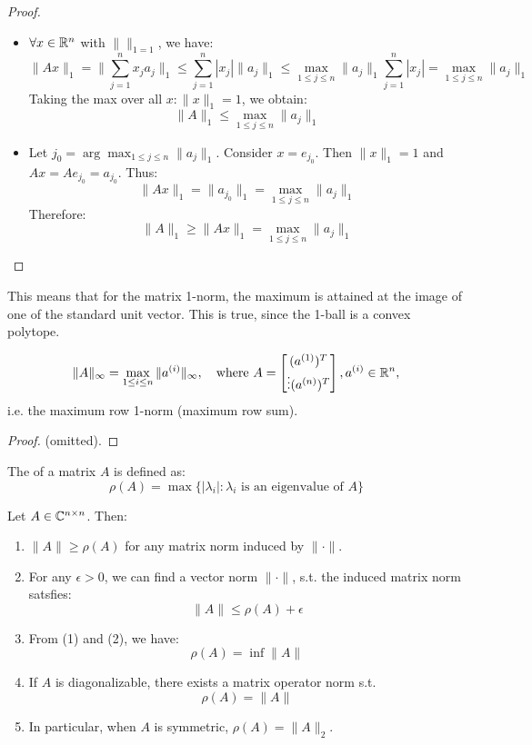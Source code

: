 \documentclass[../main/main.tex]{subfiles}
\begin{document}
\begin{proof}
\begin{itemize}
  \item $\forall x \in\mathbb{R}^{n}$ with $\|\|_{1 = 1}$, we have: \[
        \|Ax\|_{1} = \|\sum_{j=1}^n x_{j}a_{j}\|_{1} \leq \sum_{j=1}^n |x_{j}| \|a_{j}\|_{1} \leq \max_{1\leq j\leq n} \|a_{j}\|_{1} \sum_{j=1}^n |x_{j}| = \max_{1\leq j\leq n} \|a_{j}\|_{1}
        \]
        Taking the max over all $x: \|x\|_{1}=1$, we obtain: \[
\|A\|_{1} \leq \max_{1\leq j\leq n} \|a_{j}\|_{1}
        \]
  \item Let $j_{0} = \arg\max_{1\leq j\leq n} \|a_{j}\|_{1}$. Consider $x=e_{j_{0}}$. Then $\|x\|_{1}=1$ and $Ax=Ae_{j_{0}}= a_{j_{0}}$. Thus: \[
\|Ax\|_{1}= \|a_{j_{0}}\|_{1} = \max_{1\leq j\leq n} \|a_{j}\|_{1}
        \] Therefore: \[
        \|A\|_{1}\geq \|Ax\|_{1} =\max_{1\leq j\leq n} \|a_{j}\|_{1} \]
\end{itemize}
\end{proof}
\begin{remark}
This means that for the matrix 1-norm, the maximum is attained at the image of one of the standard unit vector. This is true, since the 1-ball is a convex polytope.
\end{remark}
\begin{theorem}
  \[
    \|A\|_{\infty}= \max_{1\leq i \leq n}\|a^{(i)}\|_{\infty}, \quad\text{where }A = \begin{bmatrix}
(a^{(1)})^{T}\\
\vdots
(a^{(n)})^{T}\\
    \end{bmatrix} , a^{(i)}\in\mathbb{R}^{n}
 , \] i.e. the maximum row 1-norm (maximum row sum).
\end{theorem}
\begin{proof}
  (omitted).
\end{proof}
\begin{definition}
  The  of a matrix $A$ is defined as: \[
    \rho(A) = \max \{|\lambda_{i}| : \lambda_{i} \text{ is an eigenvalue of }A
    \}\]
\end{definition}
\begin{theorem}
  Let $A\in\mathbb{C}^{n\times n}$. Then:
  \begin{enumerate}
\item $\|A\|\geq \rho(A)$ for any matrix norm induced by $\|\cdot\|$.
    \item For any $\epsilon>0$, we can find a vector norm $\|\cdot\|$, s.t. the induced matrix norm satsfies: \[
          \|A\|\leq \rho(A)+\epsilon
          \]
          \item
  From (1) and (2), we have: \[
          \rho(A) = \inf \|A\|
          \]
    \item If $A$ is diagonalizable, there exists a matrix operator norm s.t. \[
          \rho(A) = \|A\|
          \]
          \item In particular, when $A$ is symmetric, $\rho(A) = \|A\|_{2}$.
  \end{enumerate}
\end{theorem}
\end{document}

